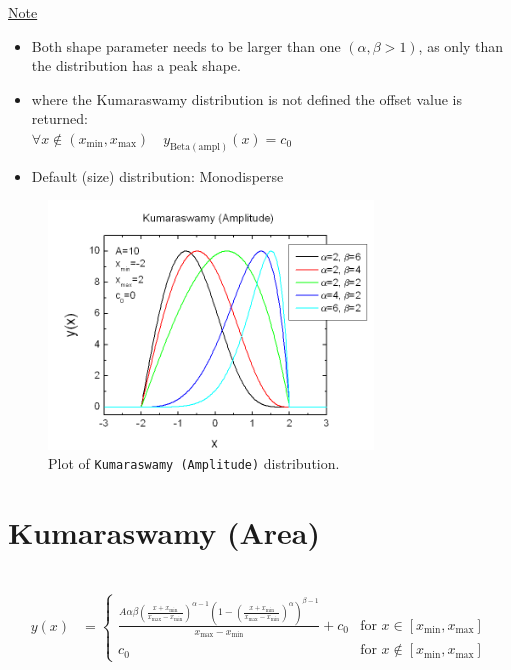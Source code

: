 \underline{Note}
\begin{itemize}
  \item Both shape parameter needs to be larger than one $(\alpha,\beta>1)$, as only than
  the distribution has a peak shape.
  \item where the Kumaraswamy distribution is not defined the offset value is returned: \\
  $\forall x\notin (x_\mathrm{min},x_\mathrm{max})\quad y_\mathrm{Beta (ampl)}(x) = c_0$
  \item Default (size) distribution: Monodisperse
\end{itemize}
\begin{figure}[htb]
\begin{center}
\includegraphics[width=0.768\textwidth]{KumaraswamyAmplitude.png}
\end{center}
\caption{Plot of \texttt{Kumaraswamy (Amplitude)} distribution.}
\label{fig:KumaraswamyAmplitude}
\end{figure}
\clearpage
\section{Kumaraswamy (Area)} ~\\
\label{sec:KumaraswamyArea}
\begin{align}
y(x) & =
\begin{cases}
\frac{A\alpha \beta \left(\frac{x+x_\text{min}}{x_\text{max}-x_\text{min}}\right)^{\alpha-1}{ \left(1-\left(\frac{x+x_\text{min}}{x_\text{max}-x_\text{min}}\right)^\alpha\right)}^{\beta-1}} {x_\text{max}-x_\text{min}}
+c_0 & \mbox{for } x \in [x_\text{min},x_\text{max}] \\
c_0 & \mbox{for } x \notin [x_\text{min},x_\text{max}]
\end{cases}
\end{align}


